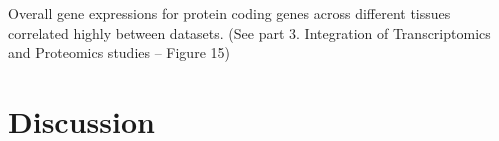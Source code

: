 Overall gene expressions for protein coding genes across different tissues
correlated highly between datasets. (See part 3. Integration of Transcriptomics
and Proteomics studies – Figure 15)




\section{Discussion}\label{sec:Trans_discussion}



\begin{comment}
  \begin{figure}%
      \includegraphics%
      {transcriptomics/}\centering
      \caption[]
      {\label{fig:}\textbf{}}
  \end{figure}
\end{comment}
